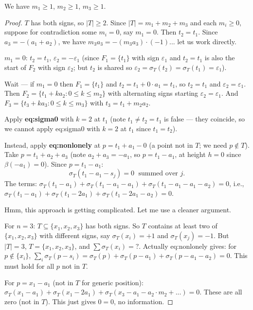 \begin{lemma}[n3m]\label{lem:n3m}
We have $m_1 \geq 1$, $m_2 \geq 1$, $m_3 \geq 1$.
\end{lemma}
\begin{proof}
$T$ has both signs, so $|T| \geq 2$. Since $|T| = m_1 + m_2 + m_3$ and each $m_i \geq 0$, suppose for contradiction some $m_i = 0$, say $m_1 = 0$. Then $t_2 = t_1$. Since $a_3 = -(a_1+a_2)$, we have $m_3 a_3 = -(m_3 a_3)\cdot(-1)$... let us work directly.

$m_1 = 0$: $t_2 = t_1$, $\varepsilon_2 = -\varepsilon_1$ (since $F_1 = \{t_1\}$ with sign $\varepsilon_1$ and $t_2 = t_1$ is also the start of $F_2$ with sign $\varepsilon_2$; but $t_2$ is shared so $\varepsilon_2 = \sigma_T(t_2) = \sigma_T(t_1) = \varepsilon_1$).

Wait — if $m_1 = 0$ then $F_1 = \{t_1\}$ and $t_2 = t_1 + 0 \cdot a_1 = t_1$, so $t_2 = t_1$ and $\varepsilon_2 = \varepsilon_1$. Then $F_2 = \{t_1 + k a_2 : 0 \leq k \leq m_2\}$ with alternating signs starting $\varepsilon_2 = \varepsilon_1$. And $F_3 = \{t_3 + k a_3 : 0 \leq k \leq m_3\}$ with $t_3 = t_1 + m_2 a_2$.

Apply \textbf{eq:sigma0} with $k=2$ at $t_1$ (note $t_1 \neq t_2 = t_1$ is false — they coincide, so we cannot apply eq:sigma0 with $k=2$ at $t_1$ since $t_1 = t_2$).

Instead, apply \textbf{eq:nonlonely} at $p = t_1 + a_1 - 0$ (a point not in $T$; we need $p \notin T$). Take $p = t_1 + a_2 + a_3$ (note $a_2 + a_3 = -a_1$, so $p = t_1 - a_1$, at height $h = 0$ since $\beta(-a_1)=0$). Since $p = t_1 - a_1$:
\[
  \sigma_T(t_1 - a_1 - s_j) = 0 \;\text{ summed over } j.
\]
The terms: $\sigma_T(t_1-a_1) + \sigma_T(t_1-a_1-a_1) + \sigma_T(t_1-a_1-a_1-a_2) = 0$, i.e., $\sigma_T(t_1-a_1) + \sigma_T(t_1-2a_1) + \sigma_T(t_1-2a_1-a_2)=0$.

Hmm, this approach is getting complicated. Let me use a cleaner argument.

\medskip

For $n=3$: $T \subseteq \{x_1,x_2,x_3\}$ has both signs. So $T$ contains at least two of $\{x_1,x_2,x_3\}$ with different signs, say $\sigma_T(x_i) = +1$ and $\sigma_T(x_j) = -1$. But $|T|=3$, $T = \{x_1,x_2,x_3\}$, and $\sum \sigma_T(x_i) = ?$. Actually eq:nonlonely gives: for $p \notin \{x_i\}$, $\sum_i \sigma_T(p - s_i) = \sigma_T(p) + \sigma_T(p-a_1) + \sigma_T(p-a_1-a_2)=0$. This must hold for all $p$ not in $T$.

For $p = x_1 - a_1$ (not in $T$ for generic position): $\sigma_T(x_1-a_1)+\sigma_T(x_1-2a_1)+\sigma_T(x_3-a_1-a_2\cdot m_2 + ...) = 0$. These are all zero (not in $T$). This just gives $0=0$, no information.


\end{proof}
